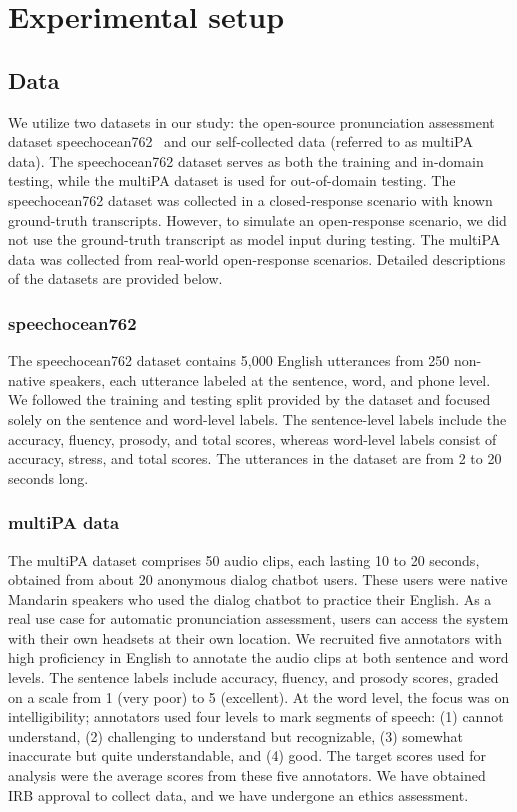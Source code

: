 \documentclass{Interspeech2024}
\begin{document}
\section{Experimental setup}

\subsection{Data}
We utilize two datasets in our study: the open-source pronunciation assessment dataset speechocean762~\cite{speechocean762} and our self-collected data (referred to as multiPA data). The speechocean762 dataset serves as both the training and in-domain testing, while the multiPA dataset is used for out-of-domain testing. The speechocean762 dataset was collected in a closed-response scenario with known ground-truth transcripts. However, to simulate an open-response scenario, we did not use the ground-truth transcript as model input during testing. The multiPA data was collected from real-world open-response scenarios. Detailed descriptions of the datasets are provided below.

\subsubsection{speechocean762}
The speechocean762 dataset contains 5,000 English utterances from 250 non-native speakers, each utterance labeled at the sentence, word, and phone level. We followed the training and testing split provided by the dataset and focused solely on the sentence and word-level labels. The sentence-level labels include the accuracy, fluency, prosody, and total scores, whereas word-level labels consist of accuracy, stress, and total scores. The utterances in the dataset are from 2 to 20 seconds long. 

\subsubsection{multiPA data}

The multiPA dataset comprises 50 audio clips, each lasting 10 to 20 seconds, obtained from about 20 anonymous dialog chatbot users. These users were native Mandarin speakers who used the dialog chatbot to practice their English. As a real use case for automatic pronunciation assessment, users can access the system with their own headsets at their own location. We recruited five annotators with high proficiency in English to annotate the audio clips at both sentence and word levels. The sentence labels include accuracy, fluency, and prosody scores, graded on a scale from 1 (very poor) to 5 (excellent). At the word level, the focus was on intelligibility; annotators used four levels to mark segments of speech: (1) cannot understand, (2) challenging to understand but recognizable, (3) somewhat inaccurate but quite understandable, and (4) good. The target scores used for analysis were the average scores from these five annotators. We have obtained IRB approval to collect data, and we have undergone an ethics assessment.
\end{document}
